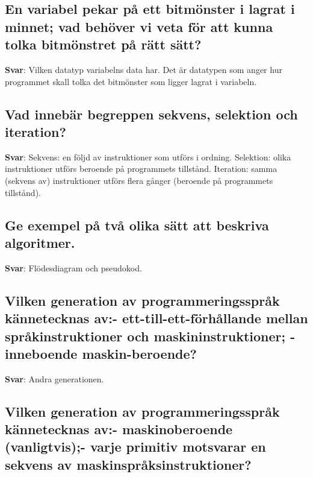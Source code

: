 \documentclass[a4paper,11pt,oneside]{article}
\begin{document}
\begin{sloppypar}
\subsection{En variabel pekar p\r{a} ett bitm\"onster i lagrat i minnet; vad beh\"over vi veta f\"or att kunna tolka bitm\"onstret p\r{a} r\"att s\"att?}

\label{q:206:sa:sv:True}

\textbf{Svar}: Vilken datatyp variabelns data har. Det \"ar datatypen som anger hur programmet skall tolka det bitm\"onster som ligger lagrat i variabeln.



\subsection{Vad inneb\"ar begreppen sekvens, selektion och iteration?}

\label{q:207:sa:sv:True}

\textbf{Svar}: Sekvens: en f\"oljd av instruktioner som utf\"ors i ordning. Selektion: olika instruktioner utf\"ors beroende p\r{a} programmets tillst\r{a}nd. Iteration: samma (sekvens av) instruktioner utf\"ors flera g\r{a}nger (beroende p\r{a} programmets tillst\r{a}nd).



\subsection{Ge exempel p\r{a} tv\r{a} olika s\"att att beskriva algoritmer.}

\label{q:208:sa:sv:True}

\textbf{Svar}: Fl\"odesdiagram och pseudokod.



\subsection{Vilken generation av programmeringsspr\r{a}k k\"annetecknas av:- ett-till-ett-f\"orh\r{a}llande mellan spr\r{a}kinstruktioner och maskininstruktioner; - inneboende maskin-beroende?}

\label{q:209:sa:sv:True}

\textbf{Svar}: Andra generationen.



\subsection{Vilken generation av programmeringsspr\r{a}k k\"annetecknas av:- maskinoberoende (vanligtvis);- varje primitiv motsvarar en sekvens av maskinspr\r{a}ksinstruktioner?}


\end{sloppypar}
\end{document}
